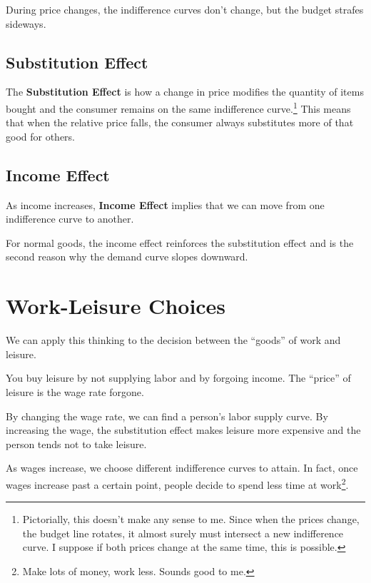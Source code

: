                     During price changes, the indifference curves don't change, but the budget strafes sideways.
                \subsection{Substitution Effect} %
                \label{sub:substitution_effect}
                    The \textbf{Substitution Effect} is how a change in price modifies the quantity of items bought and the consumer remains on the same indifference curve.\footnote{Pictorially, this doesn't make any sense to me. Since when the prices change, the budget line rotates, it almost surely must intersect a new indifference curve. I suppose if both prices change at the same time, this is possible.}
                    This means that when the relative price falls, the consumer always substitutes more of that good for others.
                \subsection{Income Effect} %
                \label{sub:income_effect}
                    As income increases, \textbf{Income Effect} implies that we can move from one indifference curve to another.

                    For normal goods, the income effect reinforces the substitution effect and is the second reason why the demand curve slopes downward.
            \section{Work-Leisure Choices} %
            \label{sec:work_leisure_choices}
                We can apply this thinking to the decision between the ``goods'' of work and leisure.

                You buy leisure by not supplying labor and by forgoing income.
                The ``price'' of leisure is the wage rate forgone.

                By changing the wage rate, we can find a person's labor supply curve.
                By increasing the wage, the substitution effect makes leisure more expensive and the person tends not to take leisure.

                As wages increase, we choose different indifference curves to attain.
                In fact, once wages increase past a certain point, people decide to spend less time at work\footnote{Make lots of money, work less. Sounds good to me.}.

